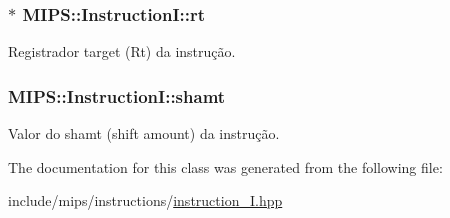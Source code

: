 \subsubsection[{\texorpdfstring{rt}{rt}}]{$\ast$ M\+I\+P\+S\+::\+Instruction\+I\+::rt\hspace{0.3cm}{\ttfamily [protected]}}\hypertarget{classMIPS_1_1InstructionI_add1db07a5c954f35271de8c8a5737487}{}\label{classMIPS_1_1InstructionI_add1db07a5c954f35271de8c8a5737487}
Registrador target (Rt) da instrução. 
\subsubsection[{\texorpdfstring{shamt}{shamt}}]{ M\+I\+P\+S\+::\+Instruction\+I\+::shamt\hspace{0.3cm}{\ttfamily [protected]}}\hypertarget{classMIPS_1_1InstructionI_aa9b6da37c374c2ec8d96448d341e5e7d}{}\label{classMIPS_1_1InstructionI_aa9b6da37c374c2ec8d96448d341e5e7d}
Valor do shamt (shift amount) da instrução. 

The documentation for this class was generated from the following file\+:\begin{DoxyCompactItemize}
\item 
include/mips/instructions/\hyperlink{instruction__I_8hpp}{instruction\+\_\+\+I.\+hpp}\end{DoxyCompactItemize}

